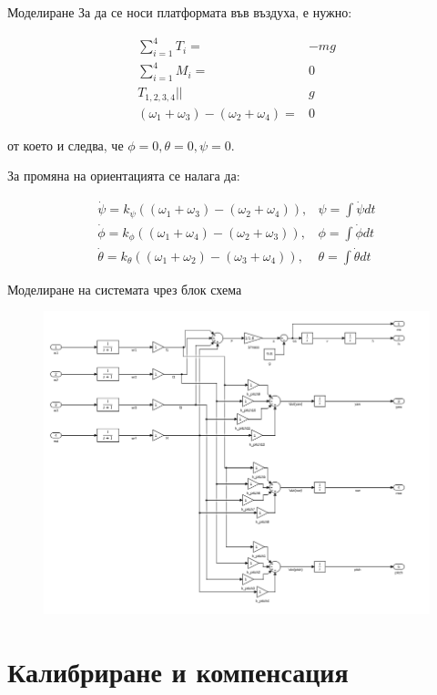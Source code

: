 \documentclass{beamer}
\begin{document}
\begin{frame}{Моделиране}
	\pause
	За да се носи платформата във въздуха, е нужно:
	\pause

\begin{align*}
		\sum_{i=1}^{4} T_i  =& -mg \\
		\sum_{i=1}^{4} M_i  =& 0 \\
		T_{1,2,3,4} ||& g \\
		( \omega_1 + \omega_3 ) - ( \omega_2 + \omega_4 ) =& 0 
\end{align*}
\pause

от което и следва, че \(\phi=0,\theta=0,\psi=0\).

\end{frame}
\begin{frame}
	\pause
		За промяна на ориентацията се налага да:
		\pause
		
		\begin{align*}
		\dot{\psi} = k_{\psi}((\omega_1+\omega_3)-(\omega_2 + \omega_4)) ,& \psi = \int \dot{\psi}dt\\
		\dot{\phi} = k_{\phi}((\omega_1 + \omega_4) - (\omega_2+\omega_3 )) ,& \phi = \int \dot{\phi}dt\\
		\dot{\theta} = k_{\theta}((\omega_1+\omega_2) - (\omega_3 +\omega_4)) ,& \theta = \int \dot{\theta}dt
\end{align*}
\end{frame}

\begin{frame}{Моделиране на системата чрез блок схема}
	\pause
	\begin{figure}[!h]
		\centering
		\includegraphics[width=0.7\columnwidth]{Images/quadrotor_simulink.png}
	\end{figure}
\end{frame}


\section{Калибриране и компенсация}
\end{document}
